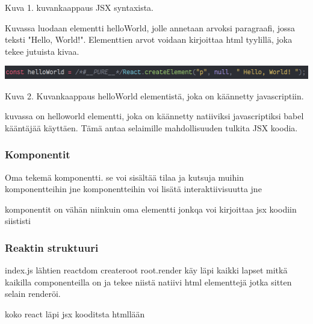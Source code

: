 \documentclass[11pt,a4paper,titlepage,oneside]{article}
\begin{document}
Kuva 1. kuvankaappaus JSX syntaxista.
\medskip

Kuvassa luodaan elementti helloWorld, jolle annetaan arvoksi paragraafi, jossa teksti "Hello, World!"{}.
Elementtien arvot voidaan kirjoittaa html tyylillä, joka tekee jutuista kivaa.
\medskip



\bigskip
\includegraphics[width=15cm]{src/public/oppar/transpiled_jsx_example.png}

Kuva 2. Kuvankaappaus helloWorld elementistä, joka on käännetty javascriptiin. 
\medskip


kuvassa on helloworld elementti, joka on käännetty natiiviksi javascriptiksi babel kääntäjää käyttäen.
Tämä antaa selaimille mahdollisuuden tulkita JSX koodia.
\medskip



\subsubsection{Komponentit}



Oma tekemä komponentti. se voi sisältää tilaa ja kutsuja muihin komponentteihin jne
komponentteihin voi lisätä interaktiivisuutta jne



komponentit on vähän niinkuin oma elementti jonkqa voi kirjoittaa jsx koodiin siististi

\medskip

\subsubsection{Reaktin struktuuri}
index.js lähtien
reactdom createroot
root.render
käy läpi kaikki lapset mitkä kaikilla componenteilla on ja tekee niistä natiivi html elementtejä jotka sitten selain renderöi. 

koko react läpi jsx kooditsta htmllään
\medskip
\end{document}

